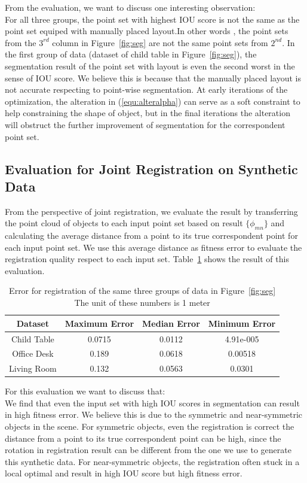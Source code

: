 From the evaluation, we want to discuss one interesting observation:\\
%
For all three groups, the point set with highest IOU score is not the same as the point set equiped with manually placed layout.In other words , the point sets from the $3^{rd}$ column in Figure~\ref{fig:seg} are not the same point sets from $2^{nd}$. In the first group of data (dataset of child table in Figure~\ref{fig:seg}), the segmentation result of the point set with layout is even the second worst in the sense of IOU score. We believe this is because that the manually placed layout is not accurate respecting to point-wise segmentation. At early iterations of the optimization, the alteration in (\ref{equ:alteralpha}) can serve as a soft constraint to help constraining the shape of object, but in the final iterations the alteration will obstruct the further improvement of segmentation for the correspondent point set. 



\subsection{Evaluation for Joint Registration on Synthetic Data}
From the perspective of joint registration, we evaluate the result by transferring the point cloud of objects  to each input point set based on result $\{\phi_{mn}\}$ and calculating the average distance from a point to its true correspondent point for each input point set.  We use this average distance as fitness error to evaluate the registration quality respect to each input set.
Table~\ref{tab:regerror} shows the result of this evaluation.
\begin{table}
\centering
\begin{tabular}{c c c c}
Dataset & Maximum Error & Median Error & Minimum Error \\
\hline
Child Table & 0.0715 & 0.0112 & 4.91e-005 \\   
Office Desk & 0.189  & 0.0618 & 0.00518 \\
Living Room & 0.132  & 0.0563 & 0.0301\\
\end{tabular}
\caption{Error for registration of the same three groups of data in Figure~\ref{fig:seg} The unit of these numbers is 1 meter}
\label{tab:regerror}
\end{table}
For this evaluation we want to discuss that:\\
We find that even the input set with high IOU scores in segmentation can result in high fitness error. We believe this is due to the symmetric and near-symmetric objects in the scene. For symmetric objects, even the registration is correct the distance from a point to its true correspondent point can be high, since the rotation in registration result can be different from the one we use to generate this synthetic data. For near-symmetric objects, the registration often stuck in a local optimal and result in high IOU score but high fitness error.
